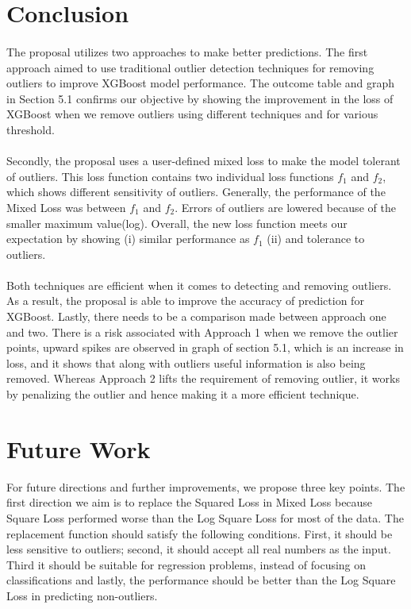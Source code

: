 \documentclass[runningheads]{llncs}
\begin{document}
\section{Conclusion}
\paragraph{} The proposal utilizes two approaches to make better predictions. The first approach aimed to use traditional outlier detection techniques for removing outliers to improve XGBoost model performance. The outcome table and graph in Section 5.1 confirms our objective by showing the improvement in the loss of XGBoost when we remove outliers using different techniques and for various threshold.


\paragraph{} Secondly, the proposal uses a user-defined mixed loss to make the model tolerant of outliers. This loss function contains two individual loss functions $f_1$ and $f_2$, which shows different sensitivity of outliers. Generally, the performance of the Mixed Loss was between $f_1$ and $f_2$. Errors of outliers are lowered because of the smaller maximum value(log). Overall, the new loss function meets our expectation by showing (i) similar performance as $f_1$ (ii) and tolerance to outliers.

\paragraph{} Both techniques are efficient when it comes to detecting and removing outliers. As a result, the proposal is able to improve the accuracy of prediction for XGBoost. Lastly, there needs to be a comparison made between approach one and two. There is a risk associated with Approach 1 when we remove the outlier points, upward spikes are observed in graph of section 5.1, which is an increase in loss, and it shows that along with outliers useful information is also being removed. Whereas Approach 2 lifts the requirement of removing outlier, it works by penalizing the outlier and hence making it a more efficient technique.



\section{Future Work} For future directions and further improvements, we propose three key points. The first direction we aim is to replace the Squared Loss in Mixed Loss because Square Loss performed worse than the Log Square Loss for most of the data. The replacement function should satisfy the following conditions. First, it should be less sensitive to outliers; second, it should accept all real numbers as the input. Third it should be suitable for regression problems, instead of focusing on classifications and lastly, the performance should be better than the Log Square Loss in predicting non-outliers.
\end{document}
